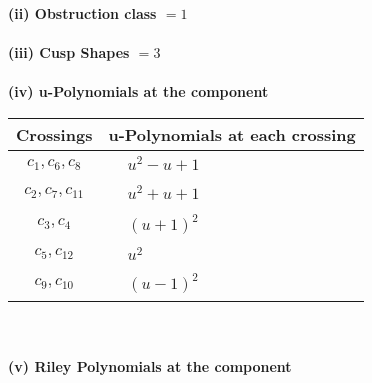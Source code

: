 \documentclass[1p]{elsarticle_modified}
\theoremstyle{definition}
\begin{document}
\flushleft \textbf{(ii) Obstruction class $= 1$}\\~\\
\flushleft \textbf{(iii) Cusp Shapes $= 3$}\\~\\
\newpage\renewcommand{\arraystretch}{1}
\flushleft \textbf{(iv) u-Polynomials at the component}\newline \\
\begin{tabular}{m{50pt}|m{274pt}}
Crossings & \hspace{64pt}u-Polynomials at each crossing \\
\hline $$\begin{aligned}c_{1},c_{6},c_{8}\end{aligned}$$&$\begin{aligned}
&u^2- u+1
\end{aligned}$\\
\hline $$\begin{aligned}c_{2},c_{7},c_{11}\end{aligned}$$&$\begin{aligned}
&u^2+u+1
\end{aligned}$\\
\hline $$\begin{aligned}c_{3},c_{4}\end{aligned}$$&$\begin{aligned}
&(u+1)^2
\end{aligned}$\\
\hline $$\begin{aligned}c_{5},c_{12}\end{aligned}$$&$\begin{aligned}
&u^2
\end{aligned}$\\
\hline $$\begin{aligned}c_{9},c_{10}\end{aligned}$$&$\begin{aligned}
&(u-1)^2
\end{aligned}$\\
\hline
\end{tabular}\\~\\
\newpage\renewcommand{\arraystretch}{1}
\flushleft \textbf{(v) Riley Polynomials at the component}\newline \\
\end{document}
